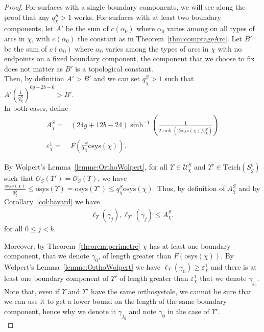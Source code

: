 \documentclass[a4paper,12pt]{article}
\theoremstyle{definition}
\theoremstyle{remark}
\begin{document}
\begin{proof}
    
    For surfaces with a single boundary components, we will see along the proof that any $q_\chi^S >1$ works. For surfaces with at least two boundary components, let $A'$ be the sum of $c(\alpha_0)$ where $\alpha_0$ varies among on all types of arcs in $\chi$, with $c(\alpha_0)$ the constant as in Theorem~\ref{thm:comptageArc}. Let $B'$ be the sum of $c(\alpha_0)$ where $\alpha_0$ varies among the types of arcs in $\chi$ with no endpoints on a fixed boundary component, the component that we choose to fix does not matter as $B'$ is a topological constant. \\
    Then, by definition $A' > B'$ and we can set $q_\chi^S>1$ such that $A' \left ( \frac{1}{q_\chi^S} \right)^{6g+2b-6} > B'$.\\
    
    In both cases, define
    \begin{align*}
        A_\chi^S = & (24g+12b-24)\sinh^{-1}\left( \frac{1}{2\sinh(2\mathrm{osys}(\chi)/q_\chi^S)} \right) \\
        \varepsilon_\chi^1 = & F(q_\chi^S\mathrm{osys}(\chi)).
    \end{align*}
    
    By Wolpert's Lemma~\ref{lemme:OrthoWolpert}, for all $\Upsilon \in \mathcal{U}_\chi^S$ and $\Upsilon' \in \mathrm{Teich}(S_g^b)$ such that $\mathcal{O}_S(\Upsilon')=\mathcal{O}_S(\Upsilon)$, we have $\frac{\mathrm{osys}(\chi)}{q_\chi^S} \leqslant \mathrm{osys}(\Upsilon) = \mathrm{osys}(\Upsilon') \leqslant q_\chi^S\mathrm{osys}(\chi)$. Thus, by definition of $A_\chi^S$ and by Corollary~\ref{col:bavard} we have
    \begin{align*}
        \ell_{\Upsilon}(\gamma_j), \ell_{\Upsilon'}(\gamma_j) \leqslant A_\chi^S,
    \end{align*}
    for all $0 \leqslant j < b$.
    
    
    Moreover, by Theorem~\ref{theorem:perimetre} $\chi$ has at least one boundary component, that we denote $\gamma_0$, of length greater than $F(\mathrm{osys}(\chi))$. By Wolpert's Lemma~\ref{lemme:OrthoWolpert} we have $\ell_{\Upsilon}(\gamma_0) \geqslant \varepsilon_\chi^1$ and there is at least one boundary component of $\Upsilon'$ of length greater than $\varepsilon_\chi^1$ that we denote $\gamma_{j_0}$. Note that, even if $\Upsilon$ and $\Upsilon'$ have the same orthosystole, we cannot be sure that we can use it to get a lower bound on the length of the same boundary component, hence why we denote it $\gamma_{j_0}$ and note $\gamma_0$ in the case of $\Upsilon'$. \\
    

\end{proof}
\end{document}

